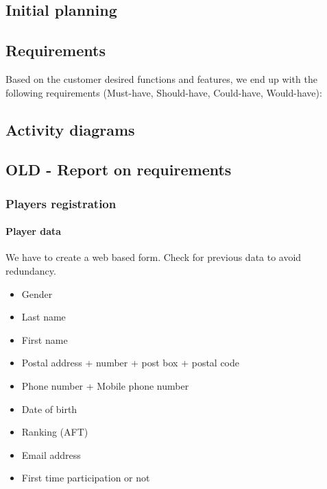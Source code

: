 \subsection{Initial planning}
\subsection{Requirements}
Based on the customer desired functions and features, we end up with the following requirements (Must-have, Should-have, Could-have, Would-have):



\subsection{Activity diagrams}
\subsection{OLD - Report on requirements}

\subsubsection{Players registration}

\paragraph{Player data}

We have to create a web based form. Check for previous data to avoid
redundancy. \newline

\begin{itemize}
    \item Gender
    \item Last name
    \item First name
    \item Postal address + number + post box + postal code
    \item Phone number + Mobile phone number
    \item Date of birth
    \item Ranking (AFT)
    \item Email address
    \item First time participation or not
\end{itemize}

